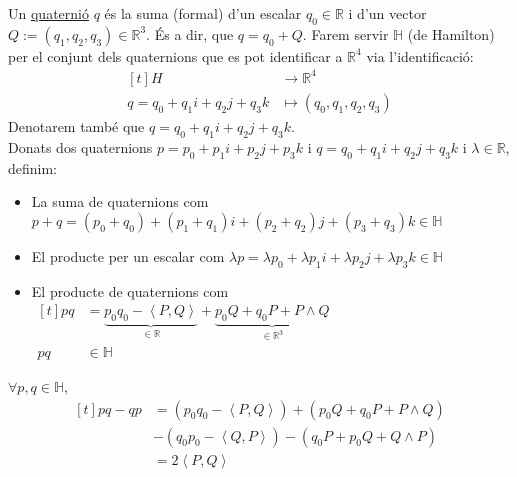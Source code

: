 \documentclass[../main.tex]{subfiles}
\begin{document}
	\begin{definicio}
		Un \underline{quaternió} $q$ és la suma (formal) d'un escalar $q_0 \in \mathbb{R}$ i d'un vector $Q := (q_1, q_2, q_3) \in \mathbb{R}^3$.
		És a dir, que $q = q_0 + Q$.
		Farem servir $\mathbb{H}$ (de Hamilton) per el conjunt dels quaternions que es pot identificar a $\mathbb{R}^4$ via l'identificació:
		\begin{displaymath}
			\begin{aligned}[t]
				H &\longrightarrow \mathbb{R}^4\\
				q=q_0+q_1i+q_2j+q_3k &\longmapsto (q_0, q_1, q_2, q_3)
			\end{aligned}
		\end{displaymath}
		Denotarem també que $q = q_0 + q_1i + q_2j + q_3k$.\\
		Donats dos quaternions $p = p_0 + p_1i + p_2j + p_3k$ i $q = q_0 + q_1i + q_2j + q_3k$ i $\lambda \in \mathbb{R}$,
		definim:
		\begin{itemize}
			\item La suma de quaternions com $p + q = (p_0 + q_0) + (p_1 + q_1)i + (p_2 + q_2)j + (p_3 + q_3)k \in \mathbb{H}$
			\item El producte per un escalar com $\lambda p = \lambda p_0 + \lambda p_1i + \lambda p_2j + \lambda p_3k \in \mathbb{H}$
			\item El producte de quaternions com $\begin{aligned}[t]pq &= \underbrace{p_0q_0-\left\langle P, Q\right\rangle}_{\in \mathbb{R}} + \underbrace{p_0Q + q_0P + P \wedge Q}_{\in \mathbb{R}^3}\\pq &\in \mathbb{H}\end{aligned}$
		\end{itemize}
	\end{definicio}

	\begin{obs}
		$\forall p,q \in \mathbb{H}$,
		\begin{displaymath}
			\begin{aligned}[t]
				pq-qp   &= \left(p_0q_0-\left\langle P, Q\right\rangle\right) + \left(p_0Q + q_0P + P \wedge Q\right)\\
						& - \left(q_0p_0-\left\langle Q, P\right\rangle\right) - \left(q_0P + p_0Q + Q \wedge P\right)\\
				    	&= 2\left\langle P, Q\right\rangle
			\end{aligned}
		\end{displaymath}
	\end{obs}
\end{document}

